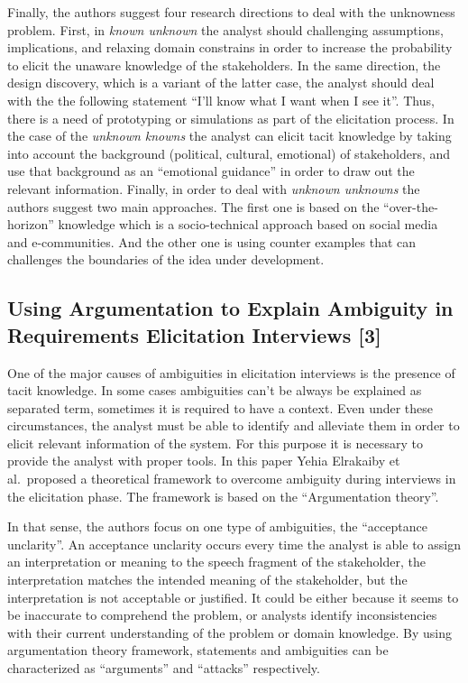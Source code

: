 \documentclass[]{llncs}
\begin{document}
Finally, the authors suggest four research directions to deal with the
unknowness problem. First, in \emph{known unknown} the analyst should
challenging assumptions, implications, and relaxing domain constrains in
order to increase the probability to elicit the unaware knowledge of the
stakeholders. In the same direction, the design discovery, which is a
variant of the latter case, the analyst should deal with the the
following statement ``I'll know what I want when I see it''. Thus, there
is a need of prototyping or simulations as part of the elicitation
process. In the case of the \emph{unknown knowns} the analyst can elicit
tacit knowledge by taking into account the background (political,
cultural, emotional) of stakeholders, and use that background as an
``emotional guidance'' in order to draw out the relevant information.
Finally, in order to deal with \emph{unknown unknowns} the authors
suggest two main approaches. The first one is based on the
``over-the-horizon'' knowledge which is a socio-technical approach based
on social media and e-communities. And the other one is using counter
examples that can challenges the boundaries of the idea under
development.

\hypertarget{using-argumentation-to-explain-ambiguity-in-requirements-elicitation-interviews-elrakaiby2017using}{%
\subsection{Using Argumentation to Explain Ambiguity in Requirements
Elicitation Interviews
{[}3{]}}\label{using-argumentation-to-explain-ambiguity-in-requirements-elicitation-interviews-elrakaiby2017using}}

One of the major causes of ambiguities in elicitation interviews is the
presence of tacit knowledge. In some cases ambiguities can't be always
be explained as separated term, sometimes it is required to have a
context. Even under these circumstances, the analyst must be able to
identify and alleviate them in order to elicit relevant information of
the system. For this purpose it is necessary to provide the analyst with
proper tools. In this paper Yehia Elrakaiby et al.~proposed a
theoretical framework to overcome ambiguity during interviews in the
elicitation phase. The framework is based on the ``Argumentation
theory''.

In that sense, the authors focus on one type of ambiguities, the
``acceptance unclarity''. An acceptance unclarity occurs every time the
analyst is able to assign an interpretation or meaning to the speech
fragment of the stakeholder, the interpretation matches the intended
meaning of the stakeholder, but the interpretation is not acceptable or
justified. It could be either because it seems to be inaccurate to
comprehend the problem, or analysts identify inconsistencies with their
current understanding of the problem or domain knowledge. By using
argumentation theory framework, statements and ambiguities can be
characterized as ``arguments'' and ``attacks'' respectively.
\end{document}
